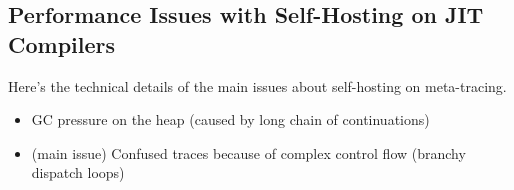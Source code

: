 \subsection{Performance Issues with Self-Hosting on JIT Compilers}
\label{subsec:performance}


Here's the technical details of the main issues about self-hosting on
meta-tracing.

\begin{itemize}
\item GC pressure on the heap (caused by long chain of continuations)

\item (main issue) Confused traces because of complex control flow
(branchy dispatch loops)
\end{itemize}
